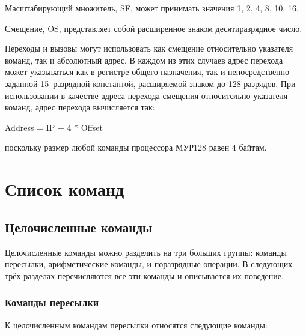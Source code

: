 \documentclass[10pt]{report}
\begin{document}
Масштабирующий множитель, SF, может принимать значения 1, 2, 4, 8, 10, 16.

Смещение, OS, представляет собой расширенное знаком десятиразрядное число.

Переходы и вызовы могут использовать как смещение относительно указателя команд, так и абсолютный адрес. В каждом из этих случаев адрес перехода может указываться как в регистре общего назначения, так и непосредственно заданной 15--разрядной константой, расширяемой знаком до 128 разрядов. При использовании в качестве адреса перехода смещения относительно указателя команд, адрес перехода вычисляется так:
\vspace{5mm}

\parbox{50mm}{%
Address = IP + 4 * Offset}
\vspace{5mm}

\noindent%
поскольку размер любой команды процессора МУР128 равен 4 байтам.
    
\chapter{Список команд}
    \section{Целочисленные команды}
Целочисленные команды можно разделить на три больших группы: команды пересылки, арифметические команды, и поразрядные операции. В следующих трёх разделах перечисляются все эти команды и описывается их поведение.    
        \subsection{Команды пересылки}
К целочисленным командам пересылки относятся следующие команды:
\end{document}
